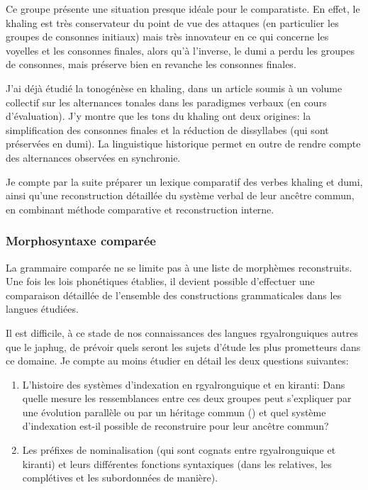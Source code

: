 \documentclass[oldfontcommands,oneside,a4paper,11pt]{article}
\begin{document}
Ce groupe présente une situation presque idéale pour le comparatiste. En effet, le khaling est très conservateur du point de vue des attaques (en particulier les groupes de consonnes initiaux) mais très innovateur en ce qui concerne les voyelles et les consonnes finales, alors qu'à l'inverse, le dumi a perdu les groupes de consonnes, mais préserve bien en revanche les consonnes finales. 


J'ai déjà étudié la tonogénèse en khaling, dans un article soumis à un volume collectif sur les alternances tonales dans les paradigmes verbaux (en cours d'évaluation). J'y montre que les tons du khaling ont deux origines: la simplification des consonnes finales et la réduction de dissyllabes (qui sont préservées en dumi). La linguistique historique permet en outre de rendre compte des alternances observées en synchronie.

Je compte par la suite préparer un lexique comparatif des verbes khaling et dumi, ainsi qu'une reconstruction détaillée du système verbal de leur ancêtre commun, en combinant méthode comparative et reconstruction interne.

\subsubsection{Morphosyntaxe comparée}
La grammaire comparée ne se limite pas à une liste de morphèmes reconstruits. Une fois les lois phonétiques établies, il devient possible d'effectuer une comparaison détaillée de l'ensemble des constructions grammaticales dans les langues étudiées.

Il est difficile, à ce stade de nos connaissances des langues rgyalronguiques autres que le japhug, de prévoir quels seront les sujets d'étude les plus prometteurs dans ce domaine. Je compte au moins étudier en détail les deux questions suivantes:
\begin{enumerate}
\item L'histoire des systèmes d'indexation en rgyalronguique et en kiranti: Dans quelle mesure les ressemblances entre ces deux groupes peut s'expliquer par une évolution parallèle ou par un héritage commun (\citealt{jacques12agreement}) et quel système d'indexation est-il possible de reconstruire pour leur ancêtre commun?
\item Les préfixes de nominalisation (qui sont cognats entre rgyalronguique et kiranti) et leurs différentes fonctions syntaxiques (dans les relatives, les complétives et les subordonnées de manière).
\end{enumerate}
\end{document}
